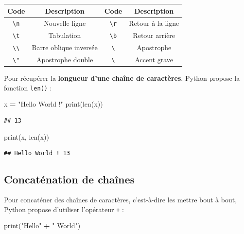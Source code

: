 \documentclass[12pt,]{book}
\newenvironment{Shaded}{\begin{snugshade}}{\end{snugshade}}
\newcommand{\StringTok}[1]{\textcolor[rgb]{0.31,0.60,0.02}{#1}}
\newcommand{\OperatorTok}[1]{\textcolor[rgb]{0.81,0.36,0.00}{\textbf{#1}}}
\newcommand{\BuiltInTok}[1]{#1}
\newcommand{\NormalTok}[1]{#1}
\numberwithin{equation}{section}
\numberwithin{countremarque}{section}
\begin{document}
\begin{longtable}[]{@{}cccc@{}}
\toprule
Code & Description & Code & Description\tabularnewline
\midrule
\endhead
\texttt{\textbackslash{}n} & Nouvelle ligne & \texttt{\textbackslash{}r}
& Retour à la ligne\tabularnewline
\texttt{\textbackslash{}t} & Tabulation & \texttt{\textbackslash{}b} &
Retour arrière\tabularnewline
\texttt{\textbackslash{}\textbackslash{}} & Barre oblique inversée &
\texttt{\textbackslash{}\textquotesingle{}} & Apostrophe\tabularnewline
\texttt{\textbackslash{}"} & Apostrophe double &
\texttt{\textbackslash{}\textasciigrave{}} & Accent grave\tabularnewline
\bottomrule
\end{longtable}

Pour récupérer la \textbf{longueur d'une chaîne de caractères}, Python
propose la fonction \texttt{len()} :

\begin{Shaded}
\begin{Highlighting}[]
\NormalTok{x }\OperatorTok{=} \StringTok{"Hello World !"}
\BuiltInTok{print}\NormalTok{(}\BuiltInTok{len}\NormalTok{(x))}
\end{Highlighting}
\end{Shaded}

\begin{lstlisting}
## 13
\end{lstlisting}

\begin{Shaded}
\begin{Highlighting}[]
\BuiltInTok{print}\NormalTok{(x, }\BuiltInTok{len}\NormalTok{(x))}
\end{Highlighting}
\end{Shaded}

\begin{lstlisting}
## Hello World ! 13
\end{lstlisting}

\subsection{Concaténation de chaînes}\label{type-chaines-concatenation}

Pour concaténer des chaînes de caractères, c'est-à-dire les mettre bout
à bout, Python propose d'utiliser l'opérateur \texttt{+} :

\begin{Shaded}
\begin{Highlighting}[]
\BuiltInTok{print}\NormalTok{(}\StringTok{"Hello"} \OperatorTok{+} \StringTok{" World"}\NormalTok{)}
\end{Highlighting}
\end{Shaded}
\end{document}
